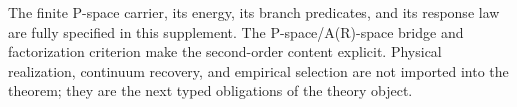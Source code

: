 \documentclass[11pt]{article}
\theoremstyle{definition}
\begin{document}
The finite P-space carrier, its energy, its branch predicates, and its response
law are fully specified in this supplement.  The P-space/A(R)-space bridge and
factorization criterion make the second-order content explicit.  Physical
realization, continuum recovery, and empirical selection are not imported into
the theorem; they are the next typed obligations of the theory object.
\end{document}
